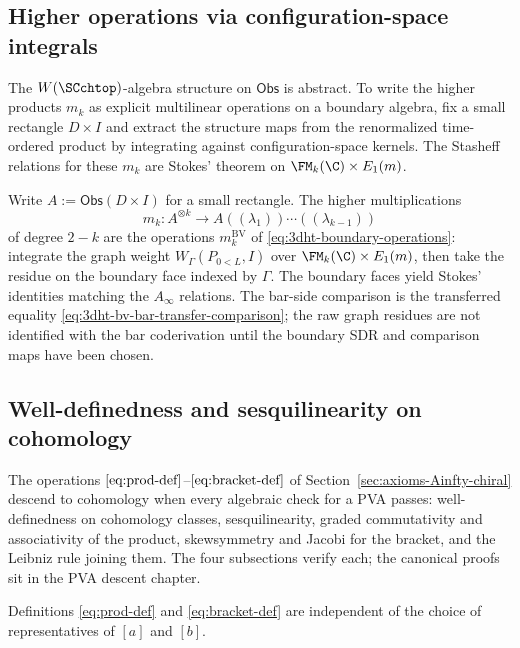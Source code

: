\subsection{Higher operations via configuration-space integrals}
\label{subsec:mk-integrals}

The $W(\SCchtop)$-algebra structure on $\mathsf{Obs}$ is abstract.
To write the higher products $m_k$ as explicit multilinear operations
on a boundary algebra, fix a small rectangle $D \times I$ and
extract the structure maps from the renormalized time-ordered
product by integrating against configuration-space kernels. The
Stasheff relations for these $m_k$ are Stokes' theorem on
$\FM_k(\C) \times E_1(m)$.

Write $A:=\mathsf{Obs}(D\times I)$ for a small rectangle. The higher multiplications
\[
m_k : A^{\otimes k}\longrightarrow A((\lambda_1))\cdots((\lambda_{k-1}))
\]
of degree $2-k$ are the operations
\(m_k^{\mathrm{BV}}\) of \eqref{eq:3dht-boundary-operations}: integrate
the graph weight \(W_\Gamma(P_{0<L},I)\) over
\(\FM_k(\C)\times E_1(m)\), then take the residue on the boundary face
indexed by \(\Gamma\). The boundary faces yield Stokes' identities
matching the \(A_\infty\) relations.  The bar-side comparison is the
transferred equality \eqref{eq:3dht-bv-bar-transfer-comparison}; the
raw graph residues are not identified with the bar coderivation until
the boundary SDR and comparison maps have been chosen.

\subsection{Well-definedness and sesquilinearity on cohomology}
\label{subsec:well-def-sesqui}

The operations $\eqref{eq:prod-def}$--$\eqref{eq:bracket-def}$ of
Section~\ref{sec:axioms-Ainfty-chiral} descend to cohomology when every algebraic check for a PVA passes: well-definedness
on cohomology classes, sesquilinearity, graded commutativity and
associativity of the product, skewsymmetry and Jacobi for the
bracket, and the Leibniz rule joining them. The four
subsections verify each; the canonical proofs sit in the
PVA descent chapter.

\begin{lemma}
\label{lem:well-definedness-prod-bracket}
Definitions \eqref{eq:prod-def} and \eqref{eq:bracket-def} are independent of the choice of representatives of $[a]$ and $[b]$.
\end{lemma}

